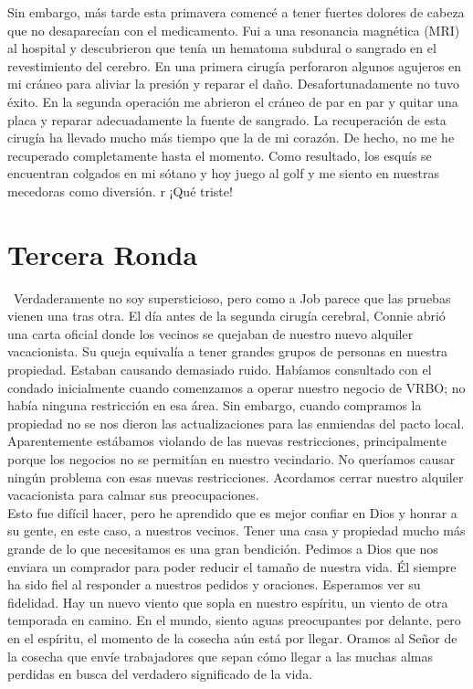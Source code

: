 \documentclass[twoside, 12pt]{book}
\begin{document}
Sin embargo, más tarde esta primavera comencé a tener fuertes dolores de cabeza que no desaparecían con el medicamento. Fui a una resonancia magnética (MRI) al hospital y descubrieron que tenía un hematoma subdural o sangrado en el revestimiento del cerebro. En una primera cirugía perforaron algunos agujeros en mi cráneo para aliviar la presión y reparar el daño. Desafortunadamente no tuvo éxito. En la segunda operación me abrieron el cráneo de par en par y quitar una placa y reparar adecuadamente la fuente de sangrado. La recuperación de esta cirugía ha llevado mucho más tiempo que la de mi corazón.  De hecho, no me he recuperado completamente hasta el momento. Como resultado, los esquís se encuentran colgados en mi sótano y hoy juego al golf y me siento en nuestras mecedoras como diversión. r ¡Qué triste!\\

\section{Tercera Ronda}
\
Verdaderamente no soy supersticioso, pero como a Job parece que las pruebas vienen una tras otra. El día antes de la segunda cirugía cerebral, Connie abrió una carta oficial donde los vecinos se quejaban de nuestro nuevo alquiler vacacionista. Su queja equivalía a tener grandes grupos de personas en nuestra propiedad. Estaban causando demasiado ruido. Habíamos consultado con el condado inicialmente cuando comenzamos a operar nuestro negocio de VRBO; no había ninguna restricción en esa área. Sin embargo, cuando compramos la propiedad no se nos dieron las actualizaciones para las enmiendas del pacto local. Aparentemente estábamos violando de las nuevas restricciones, principalmente porque los negocios no se permitían en nuestro vecindario. No queríamos causar ningún problema con esas nuevas restricciones.  Acordamos cerrar nuestro alquiler vacacionista para calmar sus preocupaciones.\\

Esto fue difícil hacer, pero he aprendido que es mejor confiar en Dios y honrar a su gente, en este caso, a nuestros vecinos. Tener una casa y propiedad mucho más grande de lo que necesitamos es una gran bendición. Pedimos a Dios que nos enviara un comprador para poder reducir el tamaño de nuestra vida. Él siempre ha sido fiel al responder a nuestros pedidos y oraciones.  Esperamos ver su fidelidad.  Hay un nuevo viento que sopla en nuestro espíritu, un viento de otra temporada en camino.  En el mundo, siento aguas preocupantes por delante, pero en el espíritu, el momento de la cosecha aún está por llegar.  Oramos al Señor de la cosecha que envíe trabajadores que sepan cómo llegar a las muchas almas perdidas en busca del verdadero significado de la vida.\\
\end{document}
